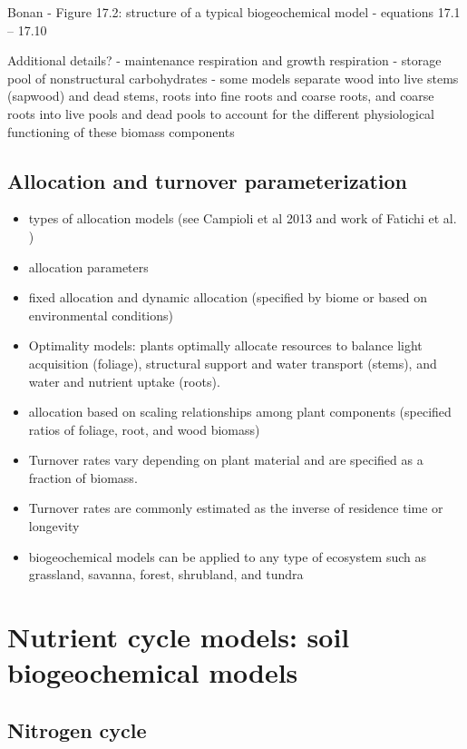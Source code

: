 \documentclass[oneside]{book}
\begin{document}
Bonan - Figure 17.2: structure of a typical biogeochemical model -
equations 17.1 -- 17.10

Additional details? - maintenance respiration and growth respiration -
storage pool of nonstructural carbohydrates - some models separate wood
into live stems (sapwood) and dead stems, roots into fine roots and
coarse roots, and coarse roots into live pools and dead pools to account
for the different physiological functioning of these biomass components

\subsection{Allocation and turnover
parameterization}\label{allocation-and-turnover-parameterization}

\begin{itemize}
\item
  types of allocation models (see Campioli et al 2013 and work of
  Fatichi et al. )
\item
  allocation parameters
\item
  fixed allocation and dynamic allocation (specified by biome or based
  on environmental conditions)
\item
  Optimality models: plants optimally allocate resources to balance
  light acquisition (foliage), structural support and water transport
  (stems), and water and nutrient uptake (roots).
\item
  allocation based on scaling relationships among plant components
  (specified ratios of foliage, root, and wood biomass)
\item
  Turnover rates vary depending on plant material and are specified as a
  fraction of biomass.
\item
  Turnover rates are commonly estimated as the inverse of residence time
  or longevity
\item
  biogeochemical models can be applied to any type of ecosystem such as
  grassland, savanna, forest, shrubland, and tundra
\end{itemize}

\section{Nutrient cycle models: soil biogeochemical
models}\label{nutrient-cycle-models-soil-biogeochemical-models}

\subsection{Nitrogen cycle}\label{nitrogen-cycle}
\end{document}
